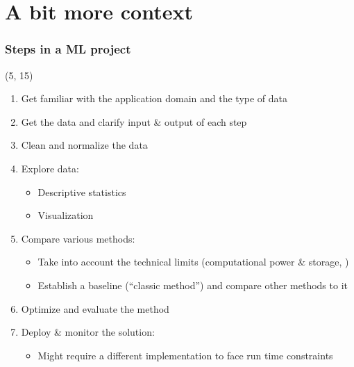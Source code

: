 \section{A bit more context}

\begin{frame}
  \frametitle{Steps in a \ac{ML} project}

  \begin{textblock}{90}(5, 15)
    \begin{enumerate}
    \item Get familiar with the application domain and the type of data
    \item Get the data and clarify input \& output of each step
    \item Clean and normalize the data
    \item Explore data:
      \begin{itemize}
      \item Descriptive statistics
      \item Visualization
      \end{itemize}
    \item Compare various methods:
      \begin{itemize}
      \item Take into account the technical limits (computational power \&
        storage, \etc{})
      \item Establish a baseline (``classic method'') and compare other methods
        to it
      \end{itemize}
    \item Optimize and evaluate the method
    \item Deploy \& monitor the solution:
      \begin{itemize}
      \item Might require a different implementation to face run time constraints
      \end{itemize}
    \end{enumerate}
  \end{textblock}
\end{frame}


